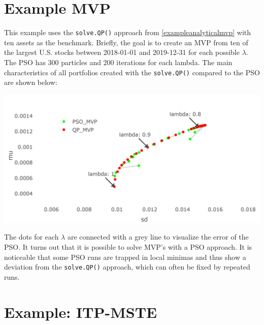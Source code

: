 \documentclass[
  oneside]{book}
\begin{document}
\hypertarget{example-mvp}{%
\section{Example MVP}\label{example-mvp}}

This example uses the \texttt{solve.QP()} approach from \ref{exampleanalyticalmvp} with ten assets as the benchmark. Briefly, the goal is to create an MVP from ten of the largest U.S. stocks between 2018-01-01 and 2019-12-31 for each possible \(\lambda\). The PSO has 300 particles and 200 iterations for each lambda. The main characteristics of all portfolios created with the \texttt{solve.QP()} compared to the PSO are shown below:

\includegraphics{Master_Thesis_files/figure-latex/pso7-1.png}

The dots for each \(\lambda\) are connected with a grey line to visualize the error of the PSO. It turns out that it is possible to solve MVP's with a PSO approach. It is noticeable that some PSO runs are trapped in local minimas and thus show a deviation from the \texttt{solve.QP()} approach, which can often be fixed by repeated runs.

\hypertarget{example-itp-mste}{%
\section{Example: ITP-MSTE}\label{example-itp-mste}}
\end{document}
